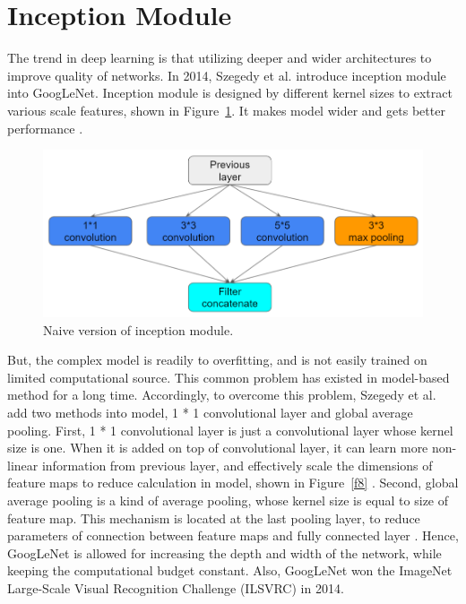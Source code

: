 \section{Inception Module}
The trend in deep learning is that utilizing deeper and wider architectures to improve quality of networks. In 2014, Szegedy et al. introduce inception module into GoogLeNet. Inception module is designed by different kernel sizes to extract various scale features, shown in Figure~\ref{f7}. It makes model wider and gets better performance \cite{szegedy2015going}.

\begin{figure}[H]
    \centering
    \includegraphics[width=0.8\columnwidth]{body/figure/figure7.png}
    \captionsetup{labelfont=bf}
    \renewcommand{\baselinestretch}{1.0}
    \caption[Naive version of inception module]{Naive version of inception module.}
    \label{f7}
\end{figure}

But, the complex model is readily to overfitting, and is not easily trained on limited computational source. This common problem has existed in model-based method for a long time. Accordingly, to overcome this problem, Szegedy et al. add two methods into model, 1 * 1 convolutional layer and global average pooling. First, 1 * 1 convolutional layer is just a convolutional layer whose kernel size is one. When it is added on top of convolutional layer, it can learn more non-linear information from previous layer, and effectively scale the dimensions of feature maps to reduce calculation in model, shown in Figure~\ref{f8} \cite{lin2013network}. Second, global average pooling is a kind of average pooling, whose kernel size is equal to size of feature map. This mechanism is located at the last pooling layer, to reduce parameters of connection between feature maps and fully connected layer \cite{lin2013network}. Hence, GoogLeNet is allowed for increasing the depth and width of the network, while keeping the computational budget constant. Also, GoogLeNet won the ImageNet Large-Scale Visual Recognition Challenge (ILSVRC) in 2014.

